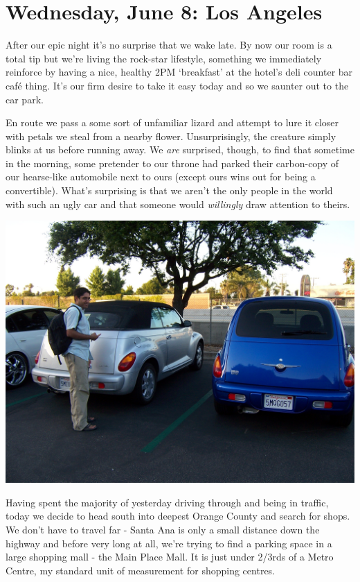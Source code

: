 \documentclass[a5paper,titlepage,11pt,draft]{book}
\begin{document}
\chapter[Los Angeles]{Wednesday, June 8: Los Angeles}
After our epic night it's no surprise that we wake late.  By now our room is a total tip but we're living the rock-star lifestyle, something we immediately reinforce by having a nice, healthy 2PM `breakfast' at the hotel's deli counter bar caf\'{e} thing.  It's our firm desire to take it easy today and so we saunter out to the car park.

En route we pass a some sort of unfamiliar lizard and attempt to lure it closer with petals we steal from a nearby flower.  Unsurprisingly, the creature simply blinks at us before running away.  We \emph{are} surprised, though, to find that sometime in the morning, some pretender to our throne had parked their carbon-copy of our hearse-like automobile next to ours (except ours wins out for being a convertible).  What's surprising is that we aren't the only people in the world with such an ugly car and that someone would \emph{willingly} draw attention to theirs.

\begin{center}\includegraphics[width=\textwidth]{gfx/100_1793}\end{center}

Having spent the majority of yesterday driving through and being in traffic, today we decide to head south into deepest Orange County and search for shops.  We don't have to travel far - Santa Ana is only a small distance down the highway and before very long at all, we're trying to find a parking space in a large shopping mall - the Main Place Mall.  It is just under 2/3rds of a Metro Centre, my standard unit of measurement for shopping centres.
\end{document}
